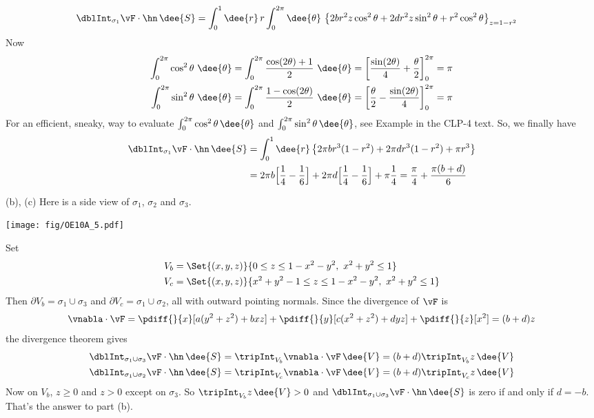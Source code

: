 \begin{solution}
\begin{align*}
\dblInt_{\sigma_1} \vF\cdot\hn\,\dee{S}
&=\int_0^1\dee{r}\, r\int_0^{2\pi}\dee{\theta}\ 
         \big\{ 2br^2z\cos^2\theta  +2 dr^2z\sin^2\theta 
                     + r^2\cos^2\theta\big\}_{z=1 - r^2}
\end{align*}
Now
\begin{align*}
\int_0^{2\pi}\cos^2\theta\ \dee{\theta}
&=\int_0^{2\pi}\frac{\cos(2\theta)+1}{2}\ \dee{\theta}
=\left[\frac{\sin(2\theta)}{4}+\frac{\theta}{2}\right]_0^{2\pi}
=\pi
\\
\int_0^{2\pi}\sin^2\theta\ \dee{\theta}
&=\int_0^{2\pi}\frac{1-\cos(2\theta)}{2}\ \dee{\theta}
=\left[\frac{\theta}{2}-\frac{\sin(2\theta)}{4}\right]_0^{2\pi}
=\pi
\end{align*}
For an efficient, sneaky, way to evaluate 
$\int_0^{2\pi} \cos^2\theta\,\dee{\theta}$ 
and $\int_0^{2\pi} \sin^2\theta\,\dee{\theta}$,
see Example
 in the CLP-4 text.
So, we finally have
\begin{align*}
\dblInt_{\sigma_1} \vF\cdot\hn\,\dee{S}
&=\int_0^1\dee{r}\,  
         \big\{ 2\pi br^3(1-r^2)  +2\pi dr^3(1-r^2) 
                     + \pi r^3\big\} \\
&=2\pi b\Big[\frac{1}{4}-\frac{1}{6}\Big]
  +2\pi d\Big[\frac{1}{4}-\frac{1}{6}\Big]
  +\pi\frac{1}{4}
=\frac{\pi}{4} +\frac{\pi(b+d)}{6}
\end{align*}

(b), (c) Here is a side view of $\sigma_1$, $\sigma_2$ and $\sigma_3$.
\begin{center}
  \texttt{[image: fig/OE10A\_5.pdf]}
\end{center}
Set
\begin{align*}
V_b &=\Set{(x,y,z)}{0\le z \le 1-x^2-y^2,\ x^2+y^2\le 1} \\
V_c &=\Set{(x,y,z)}{x^2+y^2-1 \le z \le 1-x^2-y^2,\ x^2+y^2\le 1} 
\end{align*}
Then $\partial V_b = \sigma_1\cup\sigma_3$ and 
     $\partial V_c = \sigma_1\cup\sigma_2$,
all with outward pointing normals. Since the divergence of $\vF$ is
\begin{equation*}
\vnabla\cdot\vF = 
  \pdiff{}{x}[ a ( y^2 + z^2 ) + bxz ]
  +\pdiff{}{y}[ c ( x^2 + z^2 ) + dyz ]
  +\pdiff{}{z}[ x^2]
= (b+d) z
\end{equation*}
the divergence theorem gives
\begin{align*}
\dblInt_{\sigma_1\cup\sigma_3} \vF\cdot\hn\,\dee{S}
   & = \tripInt_{V_b} \vnabla\cdot\vF\,\dee{V}
     = (b+d)\tripInt_{V_b} z\,\dee{V} \\
\dblInt_{\sigma_1\cup\sigma_2} \vF\cdot\hn\,\dee{S}
   & = \tripInt_{V_c} \vnabla\cdot\vF\,\dee{V}
     = (b+d)\tripInt_{V_c} z\,\dee{V} \\
\end{align*}
Now on $V_b$, $z\ge 0$ and $z>0$ except on $\sigma_3$. So 
$\tripInt_{V_b} z\,\dee{V}>0$ and 
$\dblInt_{\sigma_1\cup\sigma_3} \vF\cdot\hn\,\dee{S}$ is zero if and only if 
$d=-b$. That's the answer to part (b).



\end{solution}
